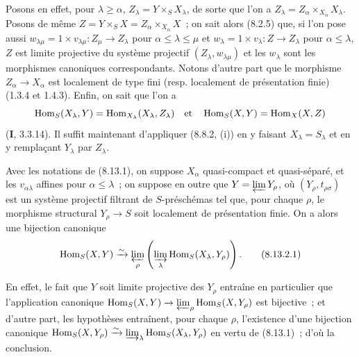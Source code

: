 Posons en effet, pour $\lambda\geqslant\alpha$,
$Z_\lambda=Y\times_S X_\lambda$, de sorte que l'on a
$Z_\lambda=Z_\alpha\times_{X_\alpha}X_\lambda$. Posons de même
$Z=Y\times_S X=Z_\alpha\times_{X_\alpha}X$~; on sait alors (8.2.5) que, si
l'on pose aussi
$w_{\lambda\mu}=1\times v_{\lambda\mu}:Z_\mu\to Z_\lambda$
pour $\alpha\leqslant\lambda\leqslant\mu$ et
$w_\lambda=1\times v_\lambda:Z\to Z_\lambda$ pour $\alpha\leqslant\lambda$,
$Z$ est limite projective du système projectif $(Z_\lambda,w_{\lambda\mu})$
et les $w_\lambda$ sont les morphismes canoniques correspondants. Notons
d'autre part que le morphisme $Z_\alpha\to X_\alpha$ est localement de type
fini (resp. localement de présentation finie) (1.3.4 et 1.4.3). Enfin, on
sait que l'on a
\[
\operatorname{Hom}_S(X_\lambda,Y)
=\operatorname{Hom}_{X_\lambda}(X_\lambda,Z_\lambda)
\quad\hbox{et}\quad
\operatorname{Hom}_S(X,Y)=\operatorname{Hom}_X(X,Z)
\]
(\textbf{I}, 3.3.14). Il suffit maintenant d'appliquer (8.8.2, (i)) en y faisant
$X_\lambda=S_\lambda$ et en y remplaçant $Y_\lambda$ par $Z_\lambda$.

\begin{corollary}[8.13.2]
\label{IV.8.13.2-fr}
Avec les notations de \textup{(8.13.1)}, on suppose $X_\alpha$ quasi-compact et
quasi-séparé, et les $v_{\alpha\lambda}$ affines pour
$\alpha\leqslant\lambda$~; on suppose en outre que
$Y=\varprojlim Y_\rho$, où $(Y_\rho,t_{\rho\sigma})$ est un système
projectif filtrant de $S$-préschémas tel que, pour chaque $\rho$, le morphisme
structural $Y_\rho\to S$ soit localement de présentation finie. On a alors une
bijection canonique
\begin{equation}
\label{IV.8.13.2.1-fr}
\operatorname{Hom}_S(X,Y)
\xrightarrow{\sim}
\varprojlim_\rho\left(\varinjlim_\lambda
\operatorname{Hom}_S(X_\lambda,Y_\rho)\right). \tag{8.13.2.1}
\end{equation}
\end{corollary}

En effet, le fait que $Y$ soit limite projective des $Y_\rho$ entraîne en
particulier que l'application canonique
$\operatorname{Hom}_S(X,Y)\to
\varprojlim_\rho\operatorname{Hom}_S(X,Y_\rho)$
est bijective~; et d'autre part, les hypothèses entraînent, pour chaque
$\rho$, l'existence d'une bijection canonique
$\operatorname{Hom}_S(X,Y_\rho)\xrightarrow{\sim}
\varinjlim_\lambda\operatorname{Hom}_S(X_\lambda,Y_\rho)$
en vertu de (8.13.1)~; d'où la conclusion.

